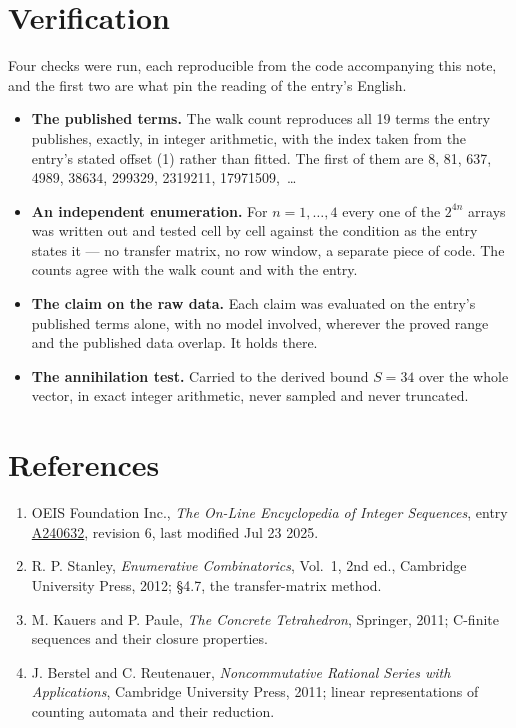 \documentclass[11pt]{article}
\theoremstyle{definition}
\begin{document}
\section{Verification}

Four checks were run, each reproducible from the code accompanying this note, and the first two are what pin the reading of the entry's English.

\begin{itemize}

\item {\bfseries The published terms.} The walk count reproduces all 19 terms the entry publishes, exactly, in integer arithmetic, with the index taken from the entry's stated offset (1) rather than fitted. The first of them are 8, 81, 637, 4989, 38634, 299329, 2319211, 17971509,~\dots

\item {\bfseries An independent enumeration.} For $n = 1,\dots,4$ every one of the $2^{4n}$ arrays was written out and tested cell by cell against the condition as the entry states it --- no transfer matrix, no row window, a separate piece of code. The counts agree with the walk count and with the entry.

\item {\bfseries The claim on the raw data.} Each claim was evaluated on the entry's published terms alone, with no model involved, wherever the proved range and the published data overlap. It holds there.

\item {\bfseries The annihilation test.} Carried to the derived bound $S = 34$ over the whole vector, in exact integer arithmetic, never sampled and never truncated.

\end{itemize}

\section{References}

\begin{enumerate}

\item OEIS Foundation Inc., \emph{The On-Line Encyclopedia of Integer Sequences}, entry \href{https://oeis.org/A240632}{A240632}, revision 6, last modified Jul 23 2025.

\item R. P. Stanley, \emph{Enumerative Combinatorics}, Vol.~1, 2nd ed., Cambridge University Press, 2012; \S4.7, the transfer-matrix method.

\item M. Kauers and P. Paule, \emph{The Concrete Tetrahedron}, Springer, 2011; C-finite sequences and their closure properties.

\item J. Berstel and C. Reutenauer, \emph{Noncommutative Rational Series with Applications}, Cambridge University Press, 2011; linear representations of counting automata and their reduction.

\end{enumerate}
\end{document}
